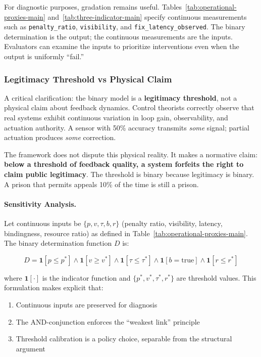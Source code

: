 For diagnostic purposes, gradation remains useful. Tables~\ref{tab:operational-proxies-main} and~\ref{tab:three-indicator-main} specify continuous measurements such as \texttt{penalty\_ratio}, \texttt{visibility}, and \texttt{fix\_latency\_observed}. The binary determination is the output; the continuous measurements are the inputs. Evaluators can examine the inputs to prioritize interventions even when the output is uniformly ``fail.''

\subsubsection{Legitimacy Threshold vs Physical Claim}

A critical clarification: the binary model is a \textbf{legitimacy threshold}, not a physical claim about feedback dynamics. Control theorists correctly observe that real systems exhibit continuous variation in loop gain, observability, and actuation authority. A sensor with 50\% accuracy transmits \textit{some} signal; partial actuation produces \textit{some} correction.

The framework does not dispute this physical reality. It makes a normative claim: \textbf{below a threshold of feedback quality, a system forfeits the right to claim public legitimacy}. The threshold is binary because legitimacy is binary. A prison that permits appeals 10\% of the time is still a prison.

\paragraph{Sensitivity Analysis.} Let continuous inputs be $\{p, v, \tau, b, r\}$ (penalty ratio, visibility, latency, bindingness, resource ratio) as defined in Table~\ref{tab:operational-proxies-main}. The binary determination function $D$ is:

\begin{equation}
D = \mathbf{1}[p \leq p^*] \land \mathbf{1}[v \geq v^*] \land \mathbf{1}[\tau \leq \tau^*] \land \mathbf{1}[b = \text{true}] \land \mathbf{1}[r \leq r^*]
\end{equation}

where $\mathbf{1}[\cdot]$ is the indicator function and $\{p^*, v^*, \tau^*, r^*\}$ are threshold values. This formulation makes explicit that:
\begin{enumerate}[noitemsep]
    \item Continuous inputs are preserved for diagnosis
    \item The AND-conjunction enforces the ``weakest link'' principle
    \item Threshold calibration is a policy choice, separable from the structural argument
\end{enumerate}

